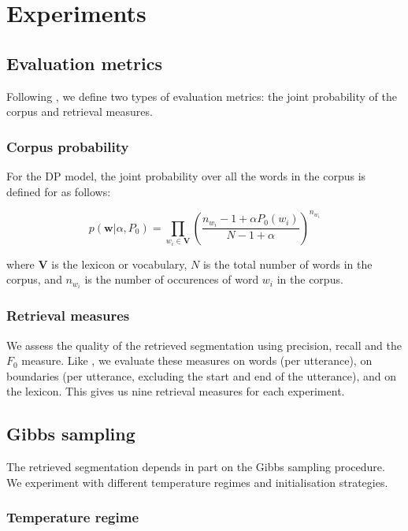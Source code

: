 \section{Experiments}

\subsection{Evaluation metrics}

Following \cite{Goldwater200921}, we define two types of evaluation metrics: the joint probability of the corpus and retrieval measures.

\subsubsection{Corpus probability}

For the DP model, the joint probability over all the words in the corpus is defined for as follows:

\begin{equation}
p(\mathbf{w} | \alpha, P_0) = \prod_{w_i \in \mathbf{V}} \left( \frac{n_{w_i} - 1 + \alpha P_0(w_i)}{N - 1 + \alpha} \right)^{n_{w_i}}
\end{equation}

where $\mathbf{V}$ is the lexicon or vocabulary, $N$ is the total number of words in the corpus, and $n_{w_i}$ is the number of occurences of word $w_i$ in the corpus.

\subsubsection{Retrieval measures}

We assess the quality of the retrieved segmentation using precision, recall and the $F_0$ measure. Like \cite{Goldwater200921}, we evaluate these measures on words (per utterance), on boundaries (per utterance, excluding the start and end of the utterance), and on the lexicon. This gives us nine retrieval measures for each experiment.

\subsection{Gibbs sampling}

The retrieved segmentation depends in part on the Gibbs sampling procedure. We experiment with different temperature regimes and initialisation strategies.

\subsubsection{Temperature regime}

